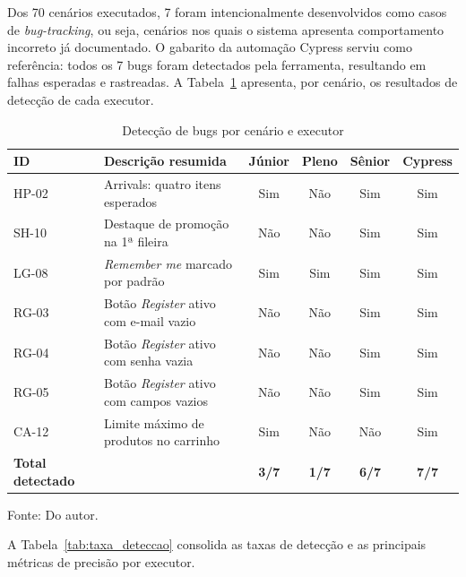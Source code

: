 \documentclass{UNESC}
\begin{document}
Dos 70 cenários executados, 7 foram intencionalmente desenvolvidos como casos de \textit{bug-tracking}, ou seja, cenários nos quais o sistema apresenta comportamento incorreto já documentado. O gabarito da automação Cypress serviu como referência: todos os 7 bugs foram detectados pela ferramenta, resultando em falhas esperadas e rastreadas. A Tabela~\ref{tab:bugs_cenarios} apresenta, por cenário, os resultados de detecção de cada executor.

\begin{table}[H]
\captionsetup{skip=2pt, singlelinecheck=false, justification=centering}
\caption{Detecção de bugs por cenário e executor}
\label{tab:bugs_cenarios}
\renewcommand{\arraystretch}{1.0}
\setlength{\extrarowheight}{4pt}
\setlength{\tabcolsep}{6pt}
\begin{tabularx}{\textwidth}{l X c c c c}
\hline
\textbf{ID} & \textbf{Descrição resumida} & \textbf{Júnior} & \textbf{Pleno} & \textbf{Sênior} & \textbf{Cypress} \\
\hline
HP-02 & Arrivals: quatro itens esperados          & Sim & Não & Sim & Sim \\
SH-10 & Destaque de promoção na 1ª fileira        & Não & Não & Sim & Sim \\
LG-08 & \textit{Remember me} marcado por padrão   & Sim & Sim & Sim & Sim \\
RG-03 & Botão \textit{Register} ativo com e-mail vazio & Não & Não & Sim & Sim \\
RG-04 & Botão \textit{Register} ativo com senha vazia  & Não & Não & Sim & Sim \\
RG-05 & Botão \textit{Register} ativo com campos vazios & Não & Não & Sim & Sim \\
CA-12 & Limite máximo de produtos no carrinho     & Sim & Não & Não & Sim \\
\hline
\textbf{Total detectado} & & \textbf{3/7} & \textbf{1/7} & \textbf{6/7} & \textbf{7/7} \\
\hline
\end{tabularx}
\vspace{2mm}\par
\noindent Fonte: Do autor.
\end{table}

A Tabela~\ref{tab:taxa_deteccao} consolida as taxas de detecção e as principais métricas de precisão por executor.
\end{document}
